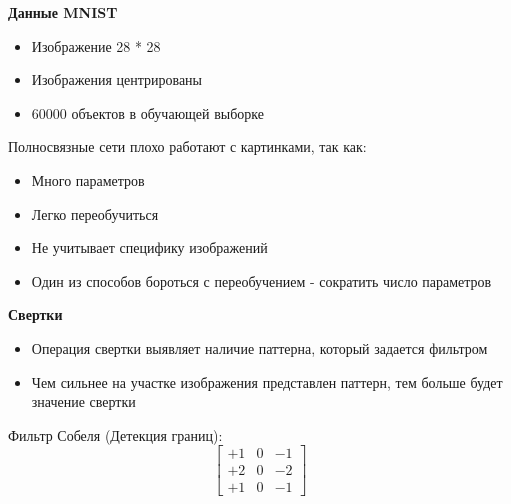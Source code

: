 \documentclass[a4paper,12pt]{article}
\begin{document}
	\textbf{Данные MNIST}
	\begin{itemize}
		\item Изображение 28 * 28
		\item Изображения центрированы 
		\item 60000 объектов в обучающей выборке
	\end{itemize}
	
	Полносвязные сети плохо работают с картинками, так как: 
	\begin{itemize}
		\item Много параметров
		\item Легко переобучиться 
		\item Не учитывает специфику изображений
		\item Один из способов бороться с переобучением - сократить число параметров
	\end{itemize}

	\textbf{Свертки}
	
	\begin{itemize}
		\item Операция свертки выявляет наличие паттерна, который задается фильтром
		\item Чем сильнее на участке изображения представлен паттерн, тем больше будет значение свертки
	\end{itemize}
	
	Фильтр Собеля (Детекция границ):
	$$\left[\begin{array}{rrr}+1 & 0 & -1 \\ +2 & 0 & -2 \\ +1 & 0 & -1\end{array}\right]$$
	
	
	
\end{document}
